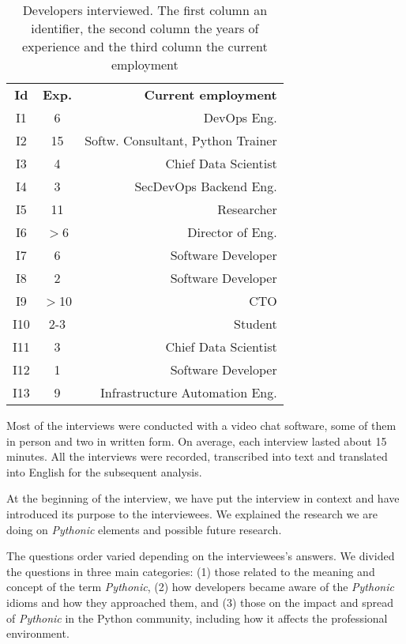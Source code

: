 \documentclass[a4paper]{article}
\begin{document}
\begin{table}
    \centering
    \begin{tabular}{c c r}
        
        \textbf{Id} & \textbf{Exp.} & \textbf{Current employment} \\
        
        I1 &  6 & DevOps Eng. \\
        I2 & 15 & Softw. Consultant, Python Trainer \\
        I3 &  4 & Chief Data Scientist \\
        I4 &  3 & SecDevOps Backend Eng. \\
        I5 & 11 & Researcher \\
        I6 & $>$6 & Director of Eng. \\
        I7 &  6 & Software Developer \\
        I8 &  2  & Software Developer \\
        I9 & $>$10 & CTO \\
        I10 & 2-3 & Student \\
        I11 & 3 & Chief Data Scientist \\
        I12 & 1 & Software Developer \\
        I13 & 9 & Infrastructure Automation Eng. \\ 
    \end{tabular}
    \caption{Developers interviewed. The first column an identifier, the second column the years of experience and the third column the current employment}
    \label{tab:interviewees}
\end{table}

Most of the interviews were conducted with a video chat software, some of them in person and two in written form. On average, each interview lasted about 15 minutes. All the interviews were recorded, transcribed into text and translated into English for the subsequent analysis.

At the beginning of the interview, we have put the interview in context and have introduced its purpose to the interviewees. We explained the research we are doing on \textit{Pythonic} elements and possible future research.

The questions order varied depending on the interviewees's answers. We divided the questions in three main categories: (1) those related to
the meaning and concept of the term \textit{Pythonic}, (2) how developers became aware of the \textit{Pythonic} idioms and how they approached them, and (3) those on the impact and spread of \textit{Pythonic} in the Python community, including how it affects the professional environment.
\end{document}
